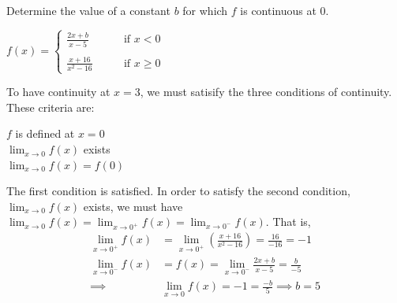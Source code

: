 \documentclass[nooutcomes, handout]{ximera}
\begin{document}
	
			

\begin{problem}
Determine the value of a constant $b$ for which $f$ is continuous at $0$.
	
	$f(x) =   \left\{ \begin{array}{ll}
	\frac{2x+b}{x-5}	 	&	\qquad \text{if } x < 0	\\ \\
	\frac{x+16}{x^2-16}		&	\qquad \text{if } x \ge 0	\end{array} \right.  $

	\begin{freeResponse}
	
To have continuity at $x = 3$, we must satisify the three conditions of continuity.  These criteria are:
	\begin{center}
	  $f$ is defined at $x = 0$\\

     	 $\lim_{x \to 0} f(x)$ exists\\

    	  $\lim_{x \to 0} f(x) = f(0)$
	\end{center}

The first condition is satisfied.  In order to satisfy the second condition,  $\lim_{x \to 0} f(x)$ exists, we must have $\lim_{x \to 0} f(x)=\lim_{x \to 0^+} f(x)=\lim_{x \to 0^-} f(x)$.
That is, 
	\begin{align*}
	\lim_{x \to 0^+} f(x)&=\lim_{x \to 0^+} \left(\frac{x+16}{x^2-16}\right)=\frac{16}{-16}=-1\\
	\lim_{x \to 0^-} f(x)&=f(x)=\lim_{x \to 0^-}\frac{2x+b}{x-5}=\frac{b}{-5}\\
	\implies & \lim_{x \to 0} f(x)=-1=\frac{-b}{5} \implies b=5
	\end{align*}

	
	\end{freeResponse}
\end{problem}
	
	
\end{document}
